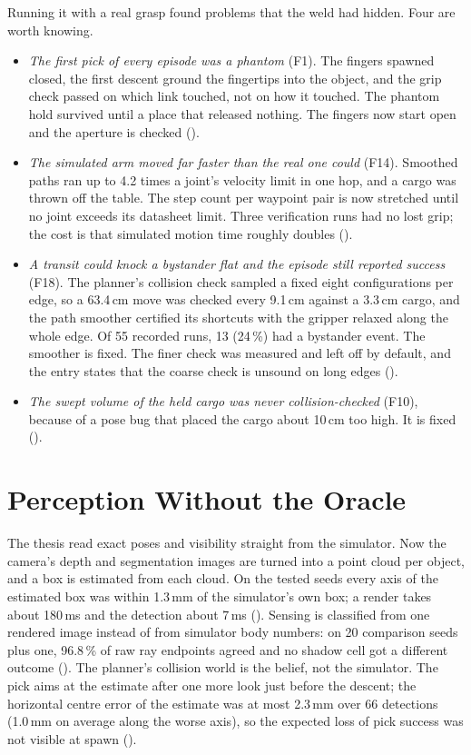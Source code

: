 Running it with a real grasp found problems that the weld had hidden. Four are
worth knowing.
\begin{itemize}
  \item \emph{The first pick of every episode was a phantom} (F1). The fingers
  spawned closed, the first descent ground the fingertips into the object, and the
  grip check passed on which link touched, not on how it touched. The phantom hold
  survived until a place that released nothing. The fingers now start open and the
  aperture is checked ().
  \item \emph{The simulated arm moved far faster than the real one could} (F14).
  Smoothed paths ran up to 4.2 times a joint's velocity limit in one hop, and a
  cargo was thrown off the table. The step count per waypoint pair is now stretched
  until no joint exceeds its datasheet limit. Three verification runs had no lost
  grip; the cost is that simulated motion time roughly doubles ().
  \item \emph{A transit could knock a bystander flat and the episode still reported
  success} (F18). The planner's collision check sampled a fixed eight
  configurations per edge, so a 63.4\,cm move was checked every 9.1\,cm against a
  3.3\,cm cargo, and the path smoother certified its shortcuts with the gripper
  relaxed along the whole edge. Of 55 recorded
  runs, 13 (24\,\%) had a bystander event. The smoother is fixed. The finer check
  was measured and left off by default, and the entry states that the coarse check
  is unsound on long edges ().
  \item \emph{The swept volume of the held cargo was never collision-checked} (F10),
  because of a pose bug that placed the cargo about 10\,cm too high. It is fixed
  ().
\end{itemize}

\section{Perception Without the Oracle}
\label{sec:perception}

The thesis read exact poses and visibility straight from the simulator. Now the
camera's depth and segmentation images are turned into a point cloud per object,
and a box is estimated from each cloud. On the tested seeds every axis of the
estimated box was within 1.3\,mm of the simulator's own box; a render takes about
180\,ms and the detection about 7\,ms (). Sensing is classified from one
rendered image instead of from simulator body numbers: on 20 comparison seeds plus
one, 96.8\,\% of raw ray endpoints agreed and no shadow cell got a different
outcome (). The planner's collision world is the belief, not the simulator.
The pick aims at the estimate after one more look just before the descent; the
horizontal centre error of the estimate was at most 2.3\,mm over 66 detections
(1.0\,mm on average along the worse axis), so the expected loss of pick success was not
visible at spawn ().

